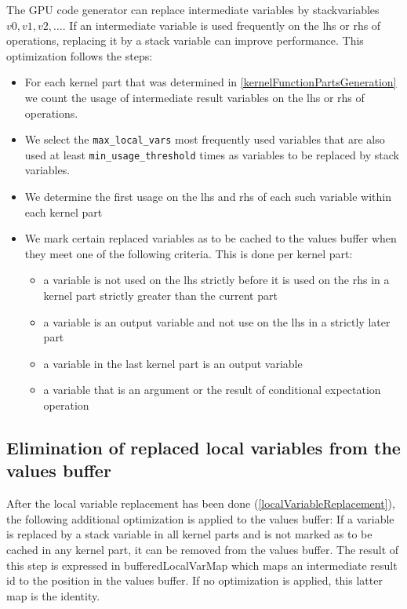 \documentclass[12pt, a4paper]{article}
\begin{document}
The GPU code generator can replace intermediate variables by stackvariables $v0, v1, v2, \ldots$. If an intermediate
variable is used frequently on the lhs or rhs of operations, replacing it by a stack variable can improve
performance. This optimization follows the steps:

\begin{itemize}
\item For each kernel part that was determined in \ref{kernelFunctionPartsGeneration} we count the usage of intermediate
  result variables on the lhs or rhs of operations.
\item We select the \verb+max_local_vars+ most frequently used variables that are also used at least
  \verb+min_usage_threshold+ times as variables to be replaced by stack variables.
\item We determine the first usage on the lhs and rhs of each such variable within each kernel part
\item We mark certain replaced variables as to be cached to the values buffer when they meet one of the following
  criteria. This is done per kernel part:
\begin{itemize}
\item a variable is not used on the lhs strictly before it is used on the rhs in a kernel part strictly greater than the
  current part
\item a variable is an output variable and not use on the lhs in a strictly later part
\item a variable in the last kernel part is an output variable
\item a variable that is an argument or the result of conditional expectation operation
\end{itemize}
\end{itemize}

\subsection{Elimination of replaced local variables from the values buffer}

After the local variable replacement has been done (\ref{localVariableReplacement}), the following additional
optimization is applied to the values buffer: If a variable is replaced by a stack variable in all kernel parts and is
not marked as to be cached in any kernel part, it can be removed from the values buffer. The result of this step is
expressed in bufferedLocalVarMap which maps an intermediate result id to the position in the values buffer. If no
optimization is applied, this latter map is the identity.


\end{document}
